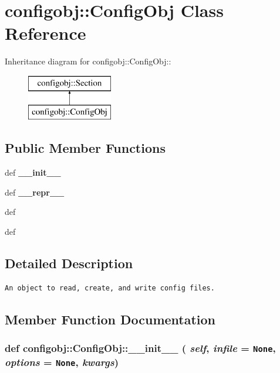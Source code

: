 \section{configobj::Config\-Obj Class Reference}
\label{classconfigobj_1_1ConfigObj}
Inheritance diagram for configobj::Config\-Obj::\begin{figure}[H]
\begin{center}
\leavevmode
\includegraphics[height=2cm]{classconfigobj_1_1ConfigObj}
\end{center}
\end{figure}
\subsection*{Public Member Functions}
\begin{CompactItemize}
\item 
def {\bf\_\-\_\-init\_\-\_\-}
\item 
def \textbf{\_\-\_\-repr\_\-\_\-}\label{classconfigobj_1_1ConfigObj_e0d8b19d3f755c83604f4e2c1027fa05}

\item 
def {\bfwrite}
\item 
def {\bfvalidate}
\end{CompactItemize}


\subsection{Detailed Description}


\footnotesize\begin{verbatim}An object to read, create, and write config files.\end{verbatim}
\normalsize
 



\subsection{Member Function Documentation}
\subsubsection{\setlength{\rightskip}{0pt plus 5cm}def configobj::Config\-Obj::\_\-\_\-init\_\-\_\- ( {\em self},  {\em infile} = {\tt None},  {\em options} = {\tt None},  {\em kwargs})}\label{classconfigobj_1_1ConfigObj_6f3d2c0ab8c49831b35389fa805417b2}




